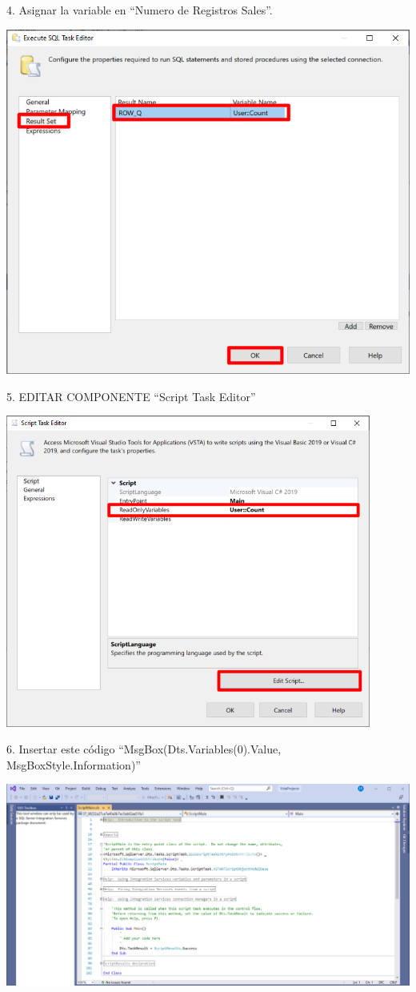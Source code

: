 \documentclass[12pt,letterpaper]{article}
\begin{document}
4. Asignar la variable en “Numero de Registros Sales”.
	\begin{center}
	\includegraphics[width=14cm]{./img/38}
	\end{center}
5. EDITAR COMPONENTE “Script Task Editor”
	\begin{center}
	\includegraphics[width=12cm]{./img/39}
	\end{center}
6. Insertar este código “MsgBox(Dts.Variables(0).Value, MsgBoxStyle.Information)”
	\begin{center}
	\includegraphics[width=17cm]{./img/40}
	\end{center}
\end{document}
